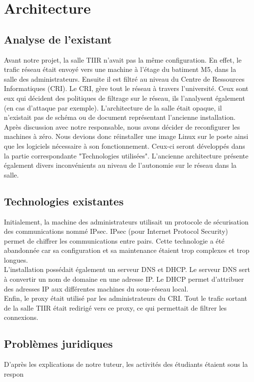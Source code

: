 \chapter{Architecture}
\label{chap:Architecture}

\section{Analyse de l'existant}

Avant notre projet, la salle TIIR n'avait pas la même configuration. En effet, le trafic réseau était envoyé vers une machine à l'étage du batiment M5, dans la salle des administrateurs. Ensuite il est filtré au niveau du Centre de Ressources Informatiques (CRI). Le CRI, gère tout le réseau à travers l'université. Ceux sont eux qui décident des politiques de filtrage sur le réseau, ils l'analysent également (en cas d'attaque par exemple). L'architecture de la salle était opaque, il n'existait pas de schéma ou de document représentant l'ancienne installation. Après discussion avec notre responsable, nous avons décider de reconfigurer les machines à zéro. Nous devions donc réinstaller une image Linux sur le poste ainsi que les logiciels nécessaire à son fonctionnement. Ceux-ci seront développés dans la partie correspondante "Technologies utilisées". L'ancienne architecture présente également divers inconvénients au niveau de l'autonomie sur le réseau dans la salle. 

\section{Technologies existantes}
Initialement, la machine des administrateurs utilisait un protocole de sécurisation des communications nommé IPsec. IPsec (pour Internet Protocol Security) permet de chiffrer les communications entre pairs. Cette technologie a été abandonnée car sa configuration et sa maintenance étaient trop complexes et trop longues.\\
L'installation possédait également un serveur DNS et DHCP. Le serveur DNS sert à convertir un nom de domaine en une adresse IP. Le DHCP permet d'attribuer des adresses IP aux différentes machines du sous-réseau local.\\
Enfin, le proxy était utilisé par les administrateurs du CRI. Tout le trafic sortant de la salle TIIR était redirigé vers ce proxy, ce qui permettait de filtrer les connexions.

\section{Problèmes juridiques}
D'après les explications de notre tuteur, les activités des étudiants étaient sous la respon
